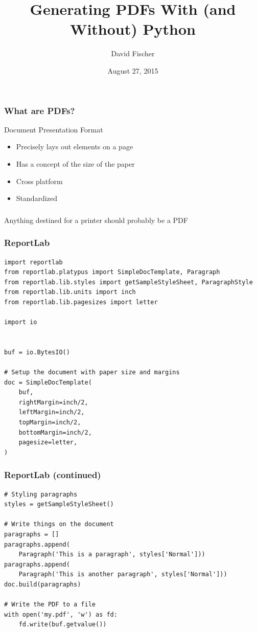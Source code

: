 \documentclass[handout]{beamer}
\title{Generating PDFs With (and Without) Python}
\author{David Fischer}
\date{August 27, 2015}
\begin{document}
\maketitle

\begin{frame}
\frametitle{What are PDFs?}
  {\huge Document Presentation Format}
\end{frame}


\begin{frame}
  \begin{itemize}
    \item Precisely lays out elements on a page
    \item Has a concept of the size of the paper
    \item Cross platform
    \item Standardized
  \end{itemize}
\end{frame}


\begin{frame}
\frametitle{}
  {\huge Anything destined for a printer should probably be a PDF}
\end{frame}


\begin{frame}[fragile]
\frametitle{ReportLab}

{\scriptsize
\begin{verbatim}
import reportlab
from reportlab.platypus import SimpleDocTemplate, Paragraph
from reportlab.lib.styles import getSampleStyleSheet, ParagraphStyle
from reportlab.lib.units import inch
from reportlab.lib.pagesizes import letter

import io


buf = io.BytesIO()

# Setup the document with paper size and margins
doc = SimpleDocTemplate(
    buf,
    rightMargin=inch/2,
    leftMargin=inch/2,
    topMargin=inch/2,
    bottomMargin=inch/2,
    pagesize=letter,
)
\end{verbatim}
}

\end{frame}


\begin{frame}[fragile]
\frametitle{ReportLab (continued)}

{\scriptsize
\begin{verbatim}
# Styling paragraphs
styles = getSampleStyleSheet()

# Write things on the document
paragraphs = []
paragraphs.append(
    Paragraph('This is a paragraph', styles['Normal']))
paragraphs.append(
    Paragraph('This is another paragraph', styles['Normal']))
doc.build(paragraphs)

# Write the PDF to a file
with open('my.pdf', 'w') as fd:
    fd.write(buf.getvalue())
\end{verbatim}
}

\end{frame}
\end{document}
